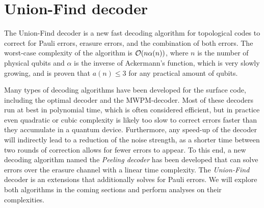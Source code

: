 \chapter{Union-Find decoder}\label{ch:UFdecoder}
The Union-Find decoder is a new fast decoding algorithm for topological codes to correct for Pauli errors, erasure errors, and the combination of both errors. The worst-case complexity of the algorithm is $\mathcal{O}(n\alpha(n))$, where $n$ is the number of physical qubits and $\alpha$ is the inverse of Ackermann's function, which is very slowly growing, and is proven that $a(n)\leq 3$ for any practical amount of qubits.

Many types of decoding algorithms have been developed for the surface code, including the optimal decoder and the MWPM-decoder. Most of these decoders run at best in polynomial time, which is often considered efficient, but in practice even quadratic or cubic complexity is likely too slow to correct errors faster than they accumulate in a quantum device. Furthermore, any speed-up of the decoder will indirectly lead to a reduction of the noise strength, as a shorter time between two rounds of correction allows for fewer errors to appear. To this end, a new decoding algorithm named the \emph{Peeling decoder} has been developed that can solve errors over the erasure channel with a linear time complexity. The \emph{Union-Find} decoder is an extensions that additionally solves for Pauli errors. We will explore both algorithms in the coming sections and perform analyses on their complexities.

